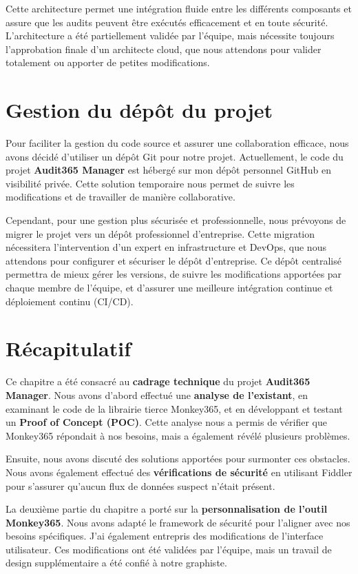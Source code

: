 Cette architecture permet une intégration fluide entre les différents composants et assure que les audits peuvent être exécutés efficacement et en toute sécurité. L'architecture a été partiellement validée par l'équipe, mais nécessite toujours l'approbation finale d'un architecte cloud, que nous attendons pour valider totalement ou apporter de petites modifications.

\section{Gestion du dépôt du projet}

Pour faciliter la gestion du code source et assurer une collaboration efficace, nous avons décidé d'utiliser un dépôt Git pour notre projet. Actuellement, le code du projet \textbf{Audit365 Manager} est hébergé sur mon dépôt personnel GitHub en visibilité privée. Cette solution temporaire nous permet de suivre les modifications et de travailler de manière collaborative.

Cependant, pour une gestion plus sécurisée et professionnelle, nous prévoyons de migrer le projet vers un dépôt professionnel d'entreprise. Cette migration nécessitera l'intervention d'un expert en infrastructure et DevOps, que nous attendons pour configurer et sécuriser le dépôt d'entreprise. Ce dépôt centralisé permettra de mieux gérer les versions, de suivre les modifications apportées par chaque membre de l'équipe, et d'assurer une meilleure intégration continue et déploiement continu (CI/CD).

\section{Récapitulatif}

Ce chapitre a été consacré au \textbf{cadrage technique} du projet \textbf{Audit365 Manager}. Nous avons d'abord effectué une \textbf{analyse de l'existant}, en examinant le code de la librairie tierce Monkey365, et en développant et testant un \textbf{Proof of Concept (POC)}. Cette analyse nous a permis de vérifier que Monkey365 répondait à nos besoins, mais a également révélé plusieurs problèmes.

Ensuite, nous avons discuté des solutions apportées pour surmonter ces obstacles. Nous avons également effectué des \textbf{vérifications de sécurité} en utilisant Fiddler pour s'assurer qu'aucun flux de données suspect n'était présent.

La deuxième partie du chapitre a porté sur la \textbf{personnalisation de l'outil Monkey365}. Nous avons adapté le framework de sécurité pour l'aligner avec nos besoins spécifiques. J'ai également entrepris des modifications de l'interface utilisateur. Ces modifications ont été validées par l'équipe, mais un travail de design supplémentaire a été confié à notre graphiste.

